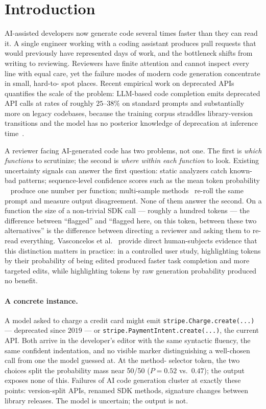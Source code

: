 \section{Introduction}
\label{sec:introduction}

AI-assisted developers now generate code several times faster than they
can read it. A single engineer working with a coding assistant produces
pull requests that would previously have represented days of work, and
the bottleneck shifts from writing to reviewing. Reviewers have finite
attention and cannot inspect every line with equal care, yet the
failure modes of modern code generation concentrate in small, hard-to-%
spot places. Recent empirical work on deprecated APIs quantifies the
scale of the problem: LLM-based code completion emits deprecated API
calls at rates of roughly $25$--$38\%$ on standard prompts and
substantially more on legacy codebases, because the training corpus
straddles library-version transitions and the model has no posterior
knowledge of deprecation at inference time~\cite{wang2025deprecated}.

A reviewer facing AI-generated code has two problems, not one. The
first is \emph{which functions} to scrutinize; the second is \emph{where
within each function} to look. Existing uncertainty signals can answer
the first question: static analyzers catch known-bad patterns;
sequence-level confidence scores such as the mean token probability
\papg~\cite{spiess2025calibration} produce one number per function;
multi-sample methods~\cite{kuhn2023semantic,uqlm2024,sharma2025multisample}
re-roll the same prompt and measure output disagreement. None of them
answer the second. On a function the size of a non-trivial SDK call
--- roughly a hundred tokens --- the difference between ``flagged''
and ``flagged here, on this token, between these two alternatives''
is the difference between directing a reviewer and asking them to
re-read everything. Vasconcelos et
al.~\cite{vasconcelos2024genprob} provide direct human-subjects
evidence that this distinction matters in practice: in a controlled
user study, highlighting tokens by their probability of being edited
produced faster task completion and more targeted edits, while
highlighting tokens by raw generation probability produced no benefit.

\paragraph{A concrete instance.}
A model asked to charge a credit card might emit
\texttt{stripe.Charge.create(...)} --- deprecated since $2019$ --- or
\texttt{stripe.PaymentIntent.create(...)}, the current API. Both
arrive in the developer's editor with the same syntactic fluency, the
same confident indentation, and no visible marker distinguishing a
well-chosen call from one the model guessed at. At the method-%
selector token, the two choices split the probability mass near
50/50 ($P=0.52$ vs.\ $0.47$); the output exposes none of this. Failures
of AI code generation cluster at exactly these points: version-split
APIs, renamed SDK methods, signature changes between library releases.
The model is uncertain; the output is not.


